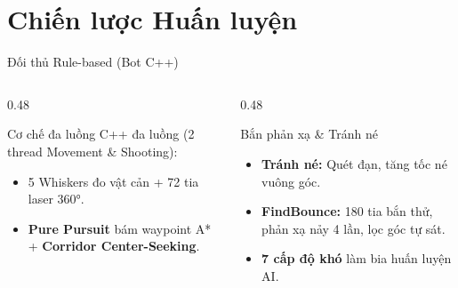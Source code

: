 \documentclass[aspectratio=169]{beamer}
\begin{document}
\section{Chiến lược Huấn luyện}

\begin{frame}{Đối thủ Rule-based (Bot C++)}
  \begin{columns}[T]
    \begin{column}{0.48\textwidth}
      \begin{block}{Cơ chế đa luồng}
        C++ đa luồng (2 thread Movement \& Shooting):
        \begin{itemize}
          \item 5 Whiskers đo vật cản + 72 tia laser 360°.
          \item \textbf{Pure Pursuit} bám waypoint A* + \textbf{Corridor Center-Seeking}.
        \end{itemize}
      \end{block}
    \end{column}
    \begin{column}{0.48\textwidth}
      \begin{block}{Bắn phản xạ \& Tránh né}
        \begin{itemize}
          \item \textbf{Tránh né:} Quét đạn, tăng tốc né vuông góc.
          \item \textbf{FindBounce:} 180 tia bắn thử, phản xạ nảy 4 lần, lọc góc tự sát.
          \item \textbf{7 cấp độ khó} làm bia huấn luyện AI.
        \end{itemize}
      \end{block}
    \end{column}
  \end{columns}
\end{frame}
\end{document}
